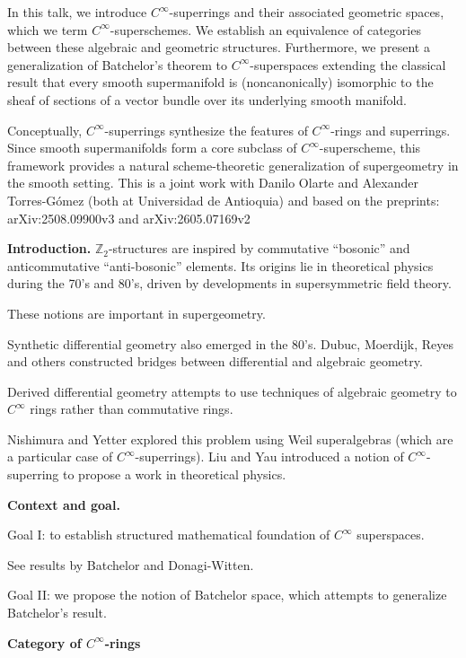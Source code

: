 In this talk, we introduce
$C^\infty$-superrings and their associated
geometric spaces, which we term
$C^\infty$-superschemes. We establish an
equivalence of categories between these
algebraic and geometric structures.
Furthermore, we present a generalization of
Batchelor’s theorem to $C^\infty$-superspaces
extending the classical result that every
smooth supermanifold is (noncanonically)
isomorphic to the sheaf of sections of a
vector bundle over its underlying smooth
manifold.

Conceptually, $C^\infty$-superrings
synthesize the features of $C^\infty$-rings
and superrings. Since smooth supermanifolds
form a core subclass of
$C^\infty$-superscheme, this framework
provides a natural scheme-theoretic
generalization of supergeometry in the smooth
setting. This is a joint work with Danilo
Olarte and Alexander Torres-Gómez (both at
Universidad de Antioquia) and based on the
preprints: arXiv:2508.09900v3 and
arXiv:2605.07169v2



\medskip\noindent
{\bf Introduction.}
$\mathbb{Z}_2$-structures
are inspired by commutative ``bosonic''
and anticommutative ``anti-bosonic''
elements. Its origins lie in theoretical
physics during the 70's and 80's, driven by
developments in supersymmetric field theory.

These notions are important in
supergeometry.
 
Synthetic differential geometry
also emerged in the 80's. Dubuc, Moerdijk,
Reyes and others constructed bridges between
differential and algebraic geometry.

Derived differential geometry attempts to
use techniques of algebraic geometry to
$C^\infty$ rings rather than commutative
rings.

Nishimura and Yetter explored this problem
using Weil superalgebras (which are a
particular case of $C^\infty$-superrings).
Liu and Yau introduced a notion of
$C^\infty$-superring to propose a work in
theoretical physics.

\medskip\noindent
{\bf Context and goal.}

Goal I: to establish structured mathematical
foundation of $C^\infty$ superspaces.

See results by Batchelor and Donagi-Witten.

Goal II: we propose the notion of Batchelor
space, which attempts to generalize
Batchelor's result.

\medskip\noindent
{\bf Category of $C^\infty$-rings}

